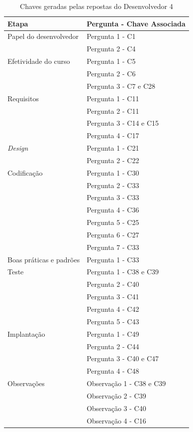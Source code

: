 \begin{table}[h]
	\centering
	\begin{tabular}{|m{4.8cm} | m{4.8cm} |}
		\hline
		\textbf{Etapa} & \textbf{Pergunta - Chave Associada} \\ \hline
		Papel do desenvolvedor & Pergunta 1 - C1 \\ \cline{2-2}
		& Pergunta 2 - C4 \\ \cline{2-2}
		\hline
		Efetividade do curso & Pergunta 1 - C5 \\ \cline{2-2}
		& Pergunta 2 - C6 \\ \cline{2-2}
		& Pergunta 3 - C7 e C28 \\ \cline{2-2}
		\hline
		Requisitos & Pergunta 1 - C11 \\ \cline{2-2}
		 & Pergunta 2 - C11 \\ \cline{2-2}
		& Pergunta 3 - C14 e C15 \\ \cline{2-2}
		& Pergunta 4 - C17 \\ \cline{2-2}
		\hline
		\textit{Design} & Pergunta 1 - C21 \\ \cline{2-2}
		& Pergunta 2 - C22 \\ \cline{2-2}
		\hline
		Codificação & Pergunta 1 - C30 \\ \cline{2-2}
		& Pergunta 2 - C33 \\ \cline{2-2}
		& Pergunta 3 - C33 \\ \cline{2-2}
		& Pergunta 4 - C36 \\ \cline{2-2}
		& Pergunta 5 - C25 \\ \cline{2-2}
		& Pergunta 6 - C27 \\ \cline{2-2}
		& Pergunta 7 - C33 \\ \cline{2-2} \hline
		Boas práticas e padrões & Pergunta 1 - C33 \\
		\hline
		Teste & Pergunta 1 - C38 e C39 \\ \cline{2-2}
		& Pergunta 2 - C40 \\ \cline{2-2}
		& Pergunta 3 - C41 \\ \cline{2-2}
		& Pergunta 4 - C42 \\ \cline{2-2}
		& Pergunta 5 - C43 \\ \cline{2-2}
		\hline
		Implantação & Pergunta 1 - C49 \\ \cline{2-2}
		& Pergunta 2 - C44  \\ \cline{2-2}
		& Pergunta 3 - C40 e C47 \\ \cline{2-2}
		& Pergunta 4 - C48 \\ \cline{2-2}
		\hline
		Observações & Observação 1 - C38 e C39 \\ \cline{2-2}
		& Observação 2 - C39 \\ \cline{2-2}
		& Observação 3 - C40 \\ \cline{2-2}
		& Observação 4 - C16 \\
		\hline
	\end{tabular}

	\caption{Chaves geradas pelas repostas do Desenvolvedor 4}
	\label{tab06}
\end{table}

